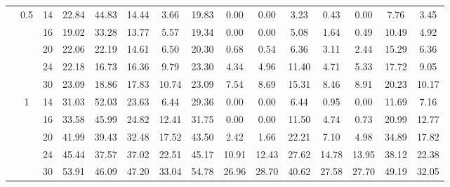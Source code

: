 \documentclass[num-refs]{wiley-article}
\begin{document}
\begin{table}[htbp!]
\begin{tabular}[t]{ccccccccccccccc}
\hline
 & 0.5 & 14 & 22.84 & 44.83 & 14.44 & 3.66 & 19.83 & 0.00 & 0.00 & 3.23 & 0.43 & 0.00 & 7.76 & 3.45\\
&& 16 & 19.02 & 33.28 & 13.77 & 5.57 & 19.34 & 0.00 & 0.00 & 5.08 & 1.64 & 0.49 & 10.49 & 4.92\\
& & 20 & 22.06 & 22.19 & 14.61 & 6.50 & 20.30 & 0.68 & 0.54 & 6.36 & 3.11 & 2.44 & 15.29 & 6.36\\
& & 24 & 22.18 & 16.73 & 16.36 & 9.79 & 23.30 & 4.34 & 4.96 & 11.40 & 4.71 & 5.33 & 17.72 & 9.05\\
& & 30 & 23.09 & 18.86 & 17.83 & 10.74 & 23.09 & 7.54 & 8.69 & 15.31 & 8.46 & 8.91 & 20.23 & 10.17\\
\hline
 & 1 & 14 & 31.03 & 52.03 & 23.63 & 6.44 & 29.36 & 0.00 & 0.00 & 6.44 & 0.95 & 0.00 & 11.69 & 7.16\\
& & 16 & 33.58 & 45.99 & 24.82 & 12.41 & 31.75 & 0.00 & 0.00 & 11.50 & 4.74 & 0.73 & 20.99 & 12.77\\
&& 20 & 41.99 & 39.43 & 32.48 & 17.52 & 43.50 & 2.42 & 1.66 & 22.21 & 7.10 & 4.98 & 34.89 & 17.82\\
& & 24 & 45.44 & 37.57 & 37.02 & 22.51 & 45.17 & 10.91 & 12.43 & 27.62 & 14.78 & 13.95 & 38.12 & 22.38\\
&& 30 & 53.91 & 46.09 & 47.20 & 33.04 & 54.78 & 26.96 & 28.70 & 40.62 & 27.58 & 27.70 & 49.19 & 32.05\\
\hline
\end{tabular}
\label{sce2:power}
\end{table}
\end{document}
